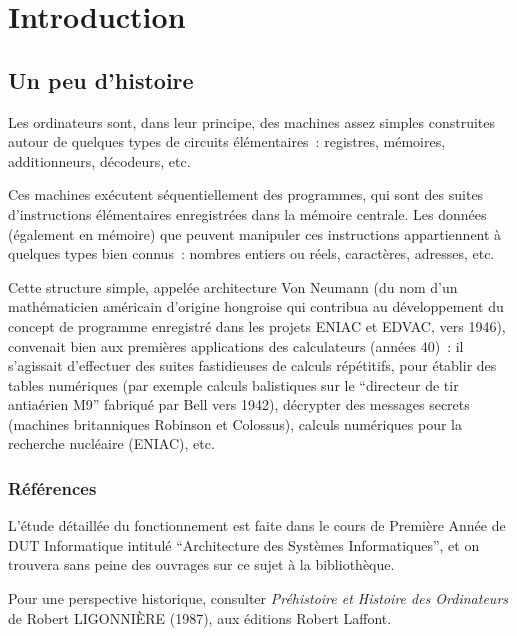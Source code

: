 \chapter{Introduction}







\section{Un peu d'histoire}

Les ordinateurs sont, dans leur principe, des machines assez simples
construites autour de quelques types de circuits élémentaires~:
registres, mémoires, additionneurs, décodeurs, etc.

Ces machines exécutent séquentiellement des programmes, qui sont des
suites d'instructions élémentaires enregistrées dans la mémoire
centrale. Les données (également en mémoire) que peuvent manipuler ces
instructions appartiennent à quelques types bien connus~: nombres
entiers ou réels, caractères, adresses, etc.

Cette structure simple, appelée architecture Von Neumann  (du nom d'un mathématicien américain d'origine
hongroise qui contribua au développement du concept de programme
enregistré dans les projets ENIAC et EDVAC, vers 1946), convenait bien
aux premières applications des calculateurs (années 40)~: il
s'agissait d'effectuer des suites fastidieuses de calculs répétitifs,
pour établir des tables numériques (par exemple calculs balistiques
sur le ``directeur de tir antiaérien M9'' fabriqué par Bell vers 1942),
décrypter des messages secrets (machines britanniques Robinson et
Colossus), calculs numériques pour la recherche nucléaire (ENIAC),
etc.


\subsection*{Références}

L'étude détaillée du fonctionnement est faite dans le cours de
Première Année de DUT Informatique intitulé ``Architecture des
Systèmes Informatiques'', et on trouvera sans peine des ouvrages sur
ce sujet à la bibliothèque.

Pour une perspective historique, consulter {\em Préhistoire et
Histoire des Ordinateurs} de Robert LIGONNIÈRE (1987), aux éditions
Robert Laffont.


